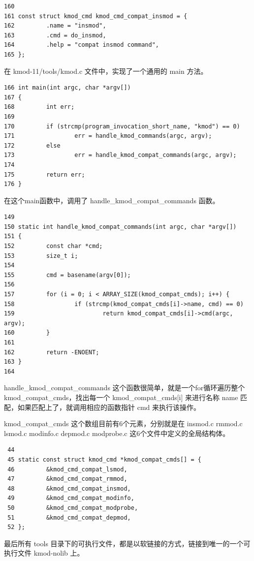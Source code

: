 \documentclass[11pt,a4paper]{article}
\begin{document}
{\begin{shaded}\begin{verbatim}
160 
161 const struct kmod_cmd kmod_cmd_compat_insmod = {
162         .name = "insmod",
163         .cmd = do_insmod,
164         .help = "compat insmod command",
165 };
\end{verbatim}\end{shaded}}
在 kmod-11/tools/kmod.c 文件中，实现了一个通用的 main 方法。

{\begin{shaded}\begin{verbatim}
166 int main(int argc, char *argv[])
167 {
168         int err;
169 
170         if (strcmp(program_invocation_short_name, "kmod") == 0)
171                 err = handle_kmod_commands(argc, argv);
172         else
173                 err = handle_kmod_compat_commands(argc, argv);
174 
175         return err;
176 }
\end{verbatim}\end{shaded}}
在这个main函数中，调用了 handle\_kmod\_compat\_commands 函数。

{\begin{shaded}\begin{verbatim}
149 
150 static int handle_kmod_compat_commands(int argc, char *argv[])
151 {
152         const char *cmd;
153         size_t i;
154 
155         cmd = basename(argv[0]);
156 
157         for (i = 0; i < ARRAY_SIZE(kmod_compat_cmds); i++) {
158                 if (strcmp(kmod_compat_cmds[i]->name, cmd) == 0)
159                         return kmod_compat_cmds[i]->cmd(argc, argv);
160         }
161 
162         return -ENOENT;
163 }
164 
\end{verbatim}\end{shaded}}
handle\_kmod\_compat\_commands 这个函数很简单，就是一个for循环遍历整个
kmod\_compat\_cmds，找出每一个 kmod\_compat\_cmds{[}i{]} 来进行名称 name
匹配，如果匹配上了，就调用相应的函数指针 cmd 来执行该操作。

kmod\_compat\_cmds 这个数组目前有6个元素，分别就是在 insmod.c rmmod.c
lsmod.c modinfo.c depmod.c modprobe.c 这6个文件中定义的全局结构体。

{\begin{shaded}\begin{verbatim}
 44
 45 static const struct kmod_cmd *kmod_compat_cmds[] = {
 46         &kmod_cmd_compat_lsmod,
 47         &kmod_cmd_compat_rmmod,
 48         &kmod_cmd_compat_insmod,
 49         &kmod_cmd_compat_modinfo,
 50         &kmod_cmd_compat_modprobe,
 51         &kmod_cmd_compat_depmod,
 52 };
\end{verbatim}\end{shaded}}
最后所有 tools
目录下的可执行文件，都是以软链接的方式，链接到唯一的一个可执行文件
kmod-nolib 上。
\end{document}
